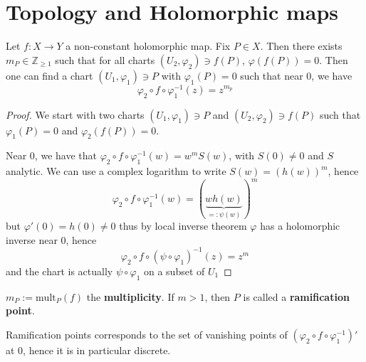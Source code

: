 \chapter{Topology and Holomorphic maps}\label{chp:top_hol}

\begin{lemma}
    Let \(f : X \to Y\) a non-constant holomorphic map. %
    Fix \(P \in X\). Then there exists \(m_P \in \mathbb{Z}_{\ge 1} \) such that
    for all charts \({(U_{2}, \varphi_{2} )} \ni f{(P)}\), \(\varphi {(f{(P)})} = 0\).
    Then one can find a chart \({(U_{1}, \varphi_{1})} \ni P\) with
    \(\varphi_{1}{(P)} = 0\) such that near 0, we have 
    \[
      \varphi_{2} \circ f \circ \varphi_{1}^{-1} {(z)} = z^{m_p}
    \]
    
\end{lemma}

\begin{proof}{}
    We start with two charts \({(U_{1}, \varphi_{1})} \ni P\) and \({(U_{2},
    \varphi_{2})} \ni f{(P)}\) such that \(\varphi_{1}{(P)} = 0\) and
    \(\varphi_{2}{(f{(P)})} = 0\).

    Near 0, we have that \(\varphi_{2} \circ f \circ \varphi_{1}^{-1}{(w)} =
    w^{m} S{(w)}\), with \(S {(0)} \neq 0\) and \(S\) analytic. We can use a
    complex logarithm to write \(S{(w)} = {\left( h{(w)} \right)} ^{m}\), hence
    \[
      \varphi_{2} \circ f \circ \varphi_{1}^{-1}{(w)} = {\left( \underbrace{w h{(w)}
      }_{=:\psi {(w)}} \right)} ^{m}
    \]
    but \(\varphi'{(0)} = h{(0)} \neq 0\) thus by local inverse theorem
    \(\varphi \) has a holomorphic inverse near 0, hence
    \[
        \varphi_{2} \circ f \circ {(\psi  \circ\varphi_{1})}^{-1}{(z)} = z^{m}
    \]
    and the chart is actually \(\psi \circ \varphi_{1}\) on a subset of \(U_{1}\) 
\end{proof}

\begin{definition}{}
    \(m_P := \mathrm{mult}_P{(f)}\) the \textbf{multiplicity}. If \(m > 1\),
    then \(P\) is called a \textbf{ramification point}.
\end{definition}

\begin{proposition}{}
    Ramification points corresponds to the set of vanishing points of \({\left(
    \varphi_{2} \circ f \circ \varphi_1^{-1}\right)}' \) at 0, hence it is in
    particular discrete.
\end{proposition}


